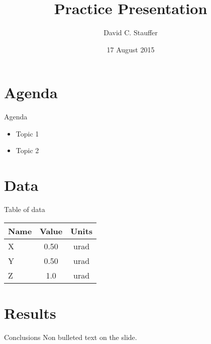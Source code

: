 \documentclass{beamer}
\title{Practice Presentation}
\author{David C. Stauffer}
\date{17 August 2015}
\begin{document}
\begin{frame}
\titlepage
\end{frame}

\section{Agenda}

\begin{frame}{Agenda}
\begin{itemize}
 \item Topic 1
 \item Topic 2
\end{itemize}
\end{frame}

\section{Data}
\begin{frame}{Table of data}
\begin{tabular}{lcc}
 Name & Value & Units \\\hline
 X & 0.50 & urad \\
 Y & 0.50 & urad \\
 Z & 1.0 & urad \\
\end{tabular}
\end{frame}

\section{Results}
\begin{frame}{Conclusions}
Non bulleted text on the slide.

\end{frame}
\end{document}
